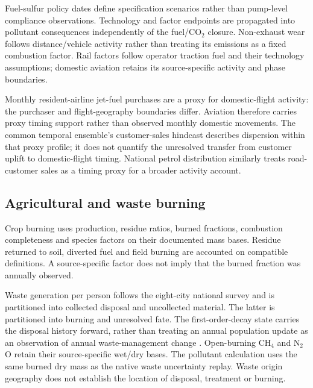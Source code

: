 \documentclass[essd]{copernicus}
\begin{document}
Fuel-sulfur policy dates define specification scenarios rather than pump-level compliance observations. Technology and factor endpoints are propagated into pollutant consequences independently of the fuel/CO$_2$ closure. Non-exhaust wear follows distance/vehicle activity rather than treating its emissions as a fixed combustion factor. Rail factors follow operator traction fuel and their technology assumptions; domestic aviation retains its source-specific activity and phase boundaries.

Monthly resident-airline jet-fuel purchases are a proxy for domestic-flight activity: the purchaser and flight-geography boundaries differ. Aviation therefore carries proxy timing support rather than observed monthly domestic movements. The common temporal ensemble's customer-sales hindcast describes dispersion within that proxy profile; it does not quantify the unresolved transfer from customer uplift to domestic-flight timing. National petrol distribution similarly treats road-customer sales as a timing proxy for a broader activity account.

\subsection{Agricultural and waste burning}
Crop burning uses production, residue ratios, burned fractions, combustion completeness and species factors on their documented mass bases. Residue returned to soil, diverted fuel and field burning are accounted on compatible definitions. A source-specific factor does not imply that the burned fraction was annually observed.

Waste generation per person follows the eight-city national survey \citep{PakEPA1996} and is partitioned into collected disposal and uncollected material. The latter is partitioned into burning and unresolved fate. The first-order-decay state carries the disposal history forward, rather than treating an annual population update as an observation of annual waste-management change \citep{IPCC2006,Kaza2018,JMP2023}. Open-burning CH$_4$ and N$_2$O retain their source-specific wet/dry bases. The pollutant calculation uses the same burned dry mass as the native waste uncertainty replay. Waste origin geography does not establish the location of disposal, treatment or burning.
\end{document}
